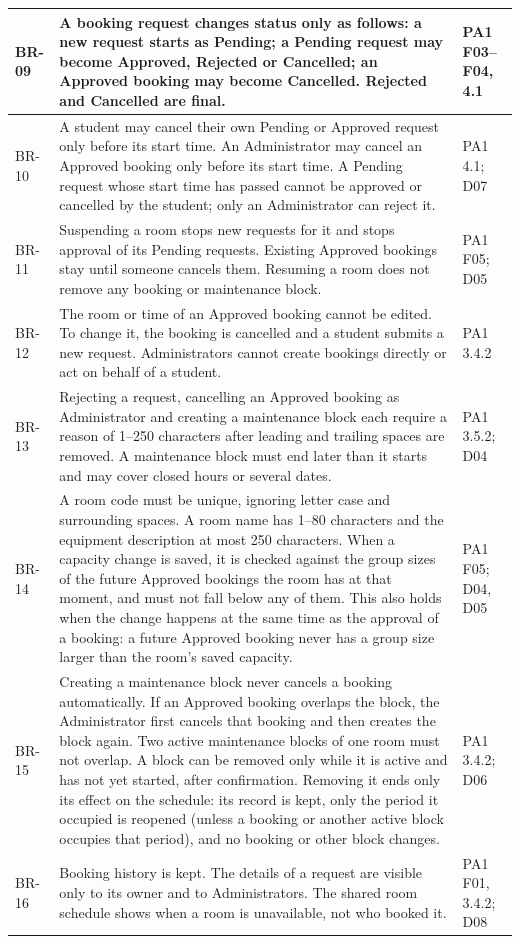 \begin{longtable}{|>{\raggedright\arraybackslash}p{}|>{\raggedright\arraybackslash}p{}|>{\raggedright\arraybackslash}p{}|}
BR-09 & A booking request changes status only as follows: a new request starts as Pending; a Pending request may become Approved, Rejected or Cancelled; an Approved booking may become Cancelled. Rejected and Cancelled are final. & PA1 F03--F04, 4.1 \\ \hline
BR-10 & A student may cancel their own Pending or Approved request only before its start time. An Administrator may cancel an Approved booking only before its start time. A Pending request whose start time has passed cannot be approved or cancelled by the student; only an Administrator can reject it. & PA1 4.1; D07 \\ \hline
BR-11 & Suspending a room stops new requests for it and stops approval of its Pending requests. Existing Approved bookings stay until someone cancels them. Resuming a room does not remove any booking or maintenance block. & PA1 F05; D05 \\ \hline
BR-12 & The room or time of an Approved booking cannot be edited. To change it, the booking is cancelled and a student submits a new request. Administrators cannot create bookings directly or act on behalf of a student. & PA1 3.4.2 \\ \hline
BR-13 & Rejecting a request, cancelling an Approved booking as Administrator and creating a maintenance block each require a reason of 1--250 characters after leading and trailing spaces are removed. A maintenance block must end later than it starts and may cover closed hours or several dates. & PA1 3.5.2; D04 \\ \hline
BR-14 & A room code must be unique, ignoring letter case and surrounding spaces. A room name has 1--80 characters and the equipment description at most 250 characters. When a capacity change is saved, it is checked against the group sizes of the future Approved bookings the room has at that moment, and must not fall below any of them. This also holds when the change happens at the same time as the approval of a booking: a future Approved booking never has a group size larger than the room's saved capacity. & PA1 F05; D04, D05 \\ \hline
BR-15 & Creating a maintenance block never cancels a booking automatically. If an Approved booking overlaps the block, the Administrator first cancels that booking and then creates the block again. Two active maintenance blocks of one room must not overlap. A block can be removed only while it is active and has not yet started, after confirmation. Removing it ends only its effect on the schedule: its record is kept, only the period it occupied is reopened (unless a booking or another active block occupies that period), and no booking or other block changes. & PA1 3.4.2; D06 \\ \hline
BR-16 & Booking history is kept. The details of a request are visible only to its owner and to Administrators. The shared room schedule shows when a room is unavailable, not who booked it. & PA1 F01, 3.4.2; D08 \\ \hline
\end{longtable}
\endgroup

